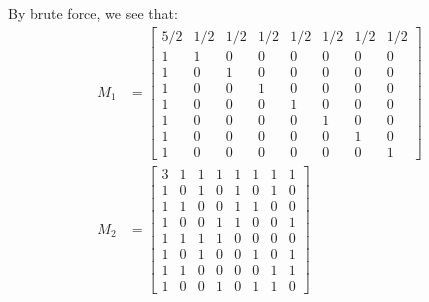 \documentclass[letterpaper]{article}
\begin{document}
By brute force, we see that:
\begin{align}
M_1 &=
    \begin{bmatrix}
        5/2 & 1/2 & 1/2 & 1/2 & 1/2 & 1/2 & 1/2 & 1/2 \\
        1 & 1 & 0 & 0 & 0 & 0 & 0 & 0 \\
        1 & 0 & 1 & 0 & 0 & 0 & 0 & 0 \\
        1 & 0 & 0 & 1 & 0 & 0 & 0 & 0 \\
        1 & 0 & 0 & 0 & 1 & 0 & 0 & 0 \\
        1 & 0 & 0 & 0 & 0 & 1 & 0 & 0 \\
        1 & 0 & 0 & 0 & 0 & 0 & 1 & 0 \\
        1 & 0 & 0 & 0 & 0 & 0 & 0 & 1
    \end{bmatrix} \\
M_2 &=
    \begin{bmatrix}
        3 & 1 & 1 & 1 & 1 & 1 & 1 & 1 \\
        1 & 0 & 1 & 0 & 1 & 0 & 1 & 0 \\
        1 & 1 & 0 & 0 & 1 & 1 & 0 & 0 \\
        1 & 0 & 0 & 1 & 1 & 0 & 0 & 1 \\
        1 & 1 & 1 & 1 & 0 & 0 & 0 & 0 \\
        1 & 0 & 1 & 0 & 0 & 1 & 0 & 1 \\
        1 & 1 & 0 & 0 & 0 & 0 & 1 & 1 \\
        1 & 0 & 0 & 1 & 0 & 1 & 1 & 0
    \end{bmatrix} \\
\end{align}
\end{document}
